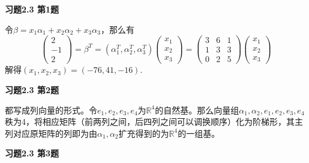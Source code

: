 \renewcommand{\newpageorvspace}{\vspace{2em}}

\date{第四次作业}



\maketitle


{\bf 习题2.3 第1题}

令$\beta = x_1\alpha_1 + x_2\alpha_2 + x_3\alpha_3$，那么有
$$\begin{pmatrix} 2 \\ -1 \\ 2 \end{pmatrix} = \beta^T = (\alpha_1^T, \alpha_2^T, \alpha_3^T) \begin{pmatrix} x_1 \\ x_2 \\ x_3 \end{pmatrix} = \begin{pmatrix} 3 & 6 & 1 \\ 1 & 3 & 3 \\ 0 & 2 & 5 \end{pmatrix} \begin{pmatrix} x_1 \\ x_2 \\ x_3 \end{pmatrix}$$
解得$(x_1,x_2,x_3) = (-76,41,-16)$.

\newpageorvspace

{\bf 习题2.3 第2题}

都写成列向量的形式。令$e_1,e_2,e_3,e_4$为$\mathbb{R}^4$的自然基。那么向量组$\alpha_1,\alpha_2,e_1,e_2,e_3,e_4$秩为4，将相应矩阵（前两列之间，后四列之间可以调换顺序）化为阶梯形，其主列对应原矩阵的列即为由$\alpha_1,\alpha_2$扩充得到的为$\mathbb{R}^4$的一组基。

\newpageorvspace

{\bf 习题2.3 第3题}


